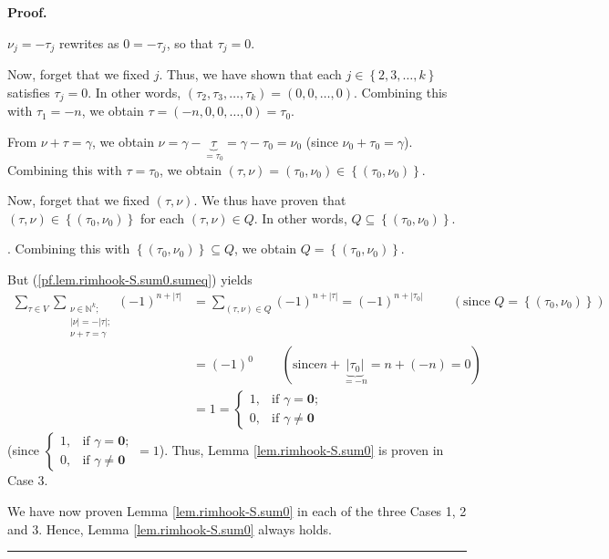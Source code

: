 \documentclass[numbers=enddot,12pt,final,onecolumn,notitlepage]{scrartcl}%
\theoremstyle{definition}
\newenvironment{proof}[1][Proof]{\noindent\textbf{#1.} }{\ \rule{0.5em}{0.5em}}
\let\sumnonlimits\sum
\renewcommand{\sum}{\sumnonlimits\limits}
\begin{document}
\begin{proof}
{$\nu_{j}=-\tau_{j}$ rewrites as $0=-\tau_{j}$, so that $\tau_{j}=0$.
\par
Now, forget that we fixed $j$. Thus, we have shown that each $j\in\left\{
2,3,\ldots,k\right\}  $ satisfies $\tau_{j}=0$. In other words, $\left(
\tau_{2},\tau_{3},\ldots,\tau_{k}\right)  =\left(  0,0,\ldots,0\right)  $.
Combining this with $\tau_{1}=-n$, we obtain $\tau=\left(  -n,0,0,\ldots
,0\right)  =\tau_{0}$.
\par
From $\nu+\tau=\gamma$, we obtain $\nu=\gamma-\underbrace{\tau}_{=\tau_{0}%
}=\gamma-\tau_{0}=\nu_{0}$ (since $\nu_{0}+\tau_{0}=\gamma$). Combining this
with $\tau=\tau_{0}$, we obtain $\left(  \tau,\nu\right)  =\left(  \tau
_{0},\nu_{0}\right)  \in\left\{  \left(  \tau_{0},\nu_{0}\right)  \right\}  $.
\par
Now, forget that we fixed $\left(  \tau,\nu\right)  $. We thus have proven
that $\left(  \tau,\nu\right)  \in\left\{  \left(  \tau_{0},\nu_{0}\right)
\right\}  $ for each $\left(  \tau,\nu\right)  \in Q$. In other words,
$Q\subseteq\left\{  \left(  \tau_{0},\nu_{0}\right)  \right\}  $.}. Combining
this with $\left\{  \left(  \tau_{0},\nu_{0}\right)  \right\}  \subseteq Q$,
we obtain $Q=\left\{  \left(  \tau_{0},\nu_{0}\right)  \right\}  $.

But (\ref{pf.lem.rimhook-S.sum0.sumeq}) yields%
\begin{align*}
\sum_{\tau\in V}\sum_{\substack{\nu\in\mathbb{N}^{k};\\\left\vert
\nu\right\vert =-\left\vert \tau\right\vert ;\\\nu+\tau=\gamma}}\left(
-1\right)  ^{n+\left\vert \tau\right\vert }  &  =\sum_{\left(  \tau
,\nu\right)  \in Q}\left(  -1\right)  ^{n+\left\vert \tau\right\vert }=\left(
-1\right)  ^{n+\left\vert \tau_{0}\right\vert }\ \ \ \ \ \ \ \ \ \ \left(
\text{since }Q=\left\{  \left(  \tau_{0},\nu_{0}\right)  \right\}  \right) \\
&  =\left(  -1\right)  ^{0}\ \ \ \ \ \ \ \ \ \ \left(  \text{since
}n+\underbrace{\left\vert \tau_{0}\right\vert }_{=-n}=n+\left(  -n\right)
=0\right) \\
&  =1=%
\begin{cases}
1, & \text{if }\gamma=\mathbf{0};\\
0, & \text{if }\gamma\neq\mathbf{0}%
\end{cases}
\end{align*}
(since $%
\begin{cases}
1, & \text{if }\gamma=\mathbf{0};\\
0, & \text{if }\gamma\neq\mathbf{0}%
\end{cases}
=1$). Thus, Lemma \ref{lem.rimhook-S.sum0} is proven in Case 3.

We have now proven Lemma \ref{lem.rimhook-S.sum0} in each of the three Cases
1, 2 and 3. Hence, Lemma \ref{lem.rimhook-S.sum0} always holds.
\end{proof}
\end{document}
